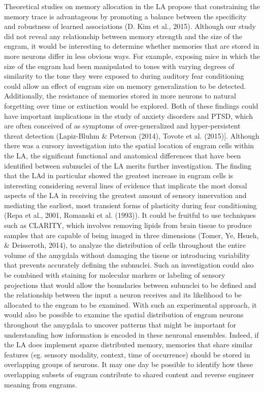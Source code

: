 \documentclass[12pt,a4paperpaper,]{report}
\begin{document}
Theoretical studies on memory allocation in the LA propose that
constraining the memory trace is advantageous by promoting a balance
between the specificity and robustness of learned associations (D. Kim
et al., 2015). Although our study did not reveal any relationship
between memory strength and the size of the engram, it would be
interesting to determine whether memories that are stored in more
neurons differ in less obvious ways. For example, exposing mice in which
the size of the engram had been manipulated to tones with varying
degrees of similarity to the tone they were exposed to during auditory
fear conditioning could allow an effect of engram size on memory
generalization to be detected. Additionally, the resistance of memories
stored in more neurons to natural forgetting over time or extinction
would be explored. Both of these findings could have important
implications in the study of anxiety disorders and PTSD, which are often
conceived of as symptoms of over-generalized and hyper-persistent threat
detection (Lapiz-Bluhm \& Peterson (2014), Tovote et al. (2015){]}.
Although there was a cursory investigation into the spatial location of
engram cells within the LA, the significant functional and anatomical
differences that have been identified between subnuclei of the LA merits
further investigation. The finding that the LAd in particular showed the
greatest increase in engram cells is interesting considering several
lines of evidence that implicate the most dorsal aspects of the LA in
receiving the greatest amount of sensory innervation and mediating the
earliest, most transient forms of plasticity during fear conditioning
(Repa et al., 2001, Romanski et al. (1993)). It could be fruitful to use
techniques such as CLARITY, which involves removing lipids from brain
tissue to produce samples that are capable of being imaged in three
dimensions (Tomer, Ye, Hsueh, \& Deisseroth, 2014), to analyze the
distribution of cells throughout the entire volume of the amygdala
without damaging the tissue or introducing variability that prevents
accurately defining the subnuclei. Such an investigation could also be
combined with staining for molecular markers or labeling of sensory
projections that would allow the boundaries between subnuclei to be
defined and the relationship between the input a neuron receives and its
likelihood to be allocated to the engram to be examined. With such an
experimental approach, it would also be possible to examine the spatial
distribution of engram neurons throughout the amygdala to uncover
patterns that might be important for understanding how information is
encoded in these neuronal ensembles. Indeed, if the LA does implement
sparse distributed memory, memories that share similar features (eg.
sensory modality, context, time of occurrence) should be stored in
overlapping groups of neurons. It may one day be possible to identify
how these overlapping subsets of engram contribute to shared content and
reverse engineer meaning from engrams.
\end{document}
